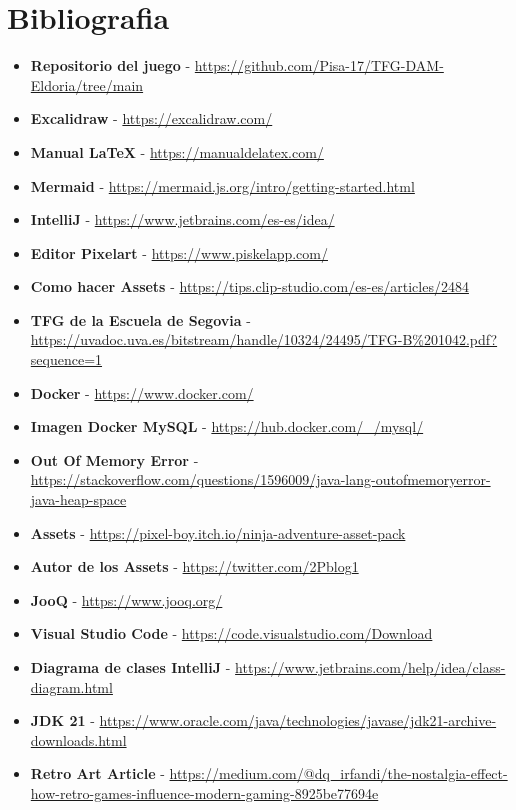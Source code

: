 \documentclass[a4paper]{article}
\begin{document}
\section{Bibliografia}
\begin{itemize}
    \item \textbf{Repositorio del juego} - \url{https://github.com/Pisa-17/TFG-DAM-Eldoria/tree/main}
    \item \textbf{Excalidraw} - \url{https://excalidraw.com/}
    \item \textbf{Manual LaTeX} - \url{https://manualdelatex.com/}
    \item \textbf{Mermaid} - \url{https://mermaid.js.org/intro/getting-started.html}
    \item \textbf{IntelliJ} - \url{https://www.jetbrains.com/es-es/idea/}
    \item \textbf{Editor Pixelart} - \url{https://www.piskelapp.com/}
    \item \textbf{Como hacer Assets} - \url{https://tips.clip-studio.com/es-es/articles/2484}
    \item \textbf{TFG de la Escuela de Segovia} - \url{https://uvadoc.uva.es/bitstream/handle/10324/24495/TFG-B%201042.pdf?sequence=1}
    \item \textbf{Docker} - \url{https://www.docker.com/}
    \item \textbf{Imagen Docker MySQL} - \url{https://hub.docker.com/_/mysql/}
    \item \textbf{Out Of Memory Error} - \url{https://stackoverflow.com/questions/1596009/java-lang-outofmemoryerror-java-heap-space}
    \item \textbf{Assets} - \url{https://pixel-boy.itch.io/ninja-adventure-asset-pack}
    \item \textbf{Autor de los Assets} - \url{https://twitter.com/2Pblog1}
    \item \textbf{JooQ} - \url{https://www.jooq.org/}
    \item \textbf{Visual Studio Code} - \url{https://code.visualstudio.com/Download}
    \item \textbf{Diagrama de clases IntelliJ} - \url{https://www.jetbrains.com/help/idea/class-diagram.html}
    \item \textbf{JDK 21} - \url{https://www.oracle.com/java/technologies/javase/jdk21-archive-downloads.html}
    \item \textbf{Retro Art Article} - \url{https://medium.com/@dq_irfandi/the-nostalgia-effect-how-retro-games-influence-modern-gaming-8925be77694e}

\end{itemize}
\end{document}
